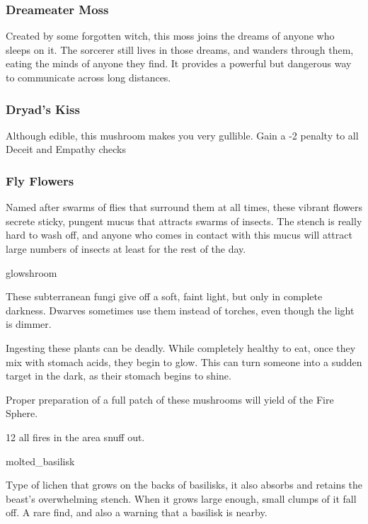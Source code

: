 \begin{multicols}{2}
\subsubsection{Dreameater Moss}
\label{dreameater_moss}
Created by some forgotten witch, this moss joins the dreams of anyone who sleeps on it.
The sorcerer still lives in those dreams, and wanders through them, eating the minds of anyone they find.
It provides a powerful but dangerous way to communicate across long distances.

\subsubsection{Dryad's Kiss}
\label{dryads_kiss}

Although edible, this mushroom makes you very gullible.
Gain a -2 penalty to all Deceit and Empathy checks

\subsubsection{Fly Flowers}
\label{fly_flowers}

Named after swarms of flies that surround them at all times, these vibrant flowers secrete sticky, pungent mucus that attracts swarms of insects.
The stench is really hard to wash off, and anyone who comes in contact with this mucus will attract large numbers of insects at least for the rest of the day.

%
  {glowshroom}%
  {
   These subterranean fungi give off a soft, faint light, but only in complete darkness.
   Dwarves sometimes use them instead of torches, even though the light is dimmer.

   Ingesting these plants can be deadly.
   While completely healthy to eat, once they mix with stomach acids, they begin to glow.
   This can turn someone into a sudden target in the dark, as their stomach begins to shine.

   Proper preparation of a full patch of these mushrooms will yield  of the Fire Sphere.
    }
  {}%
  {12}%
  {all fires in the \gls{area} snuff out.}%

%
  {molted_basilisk}%
  {
  Type of lichen that grows on the backs of basilisks, it also absorbs and retains the beast's overwhelming stench.
  When it grows large enough, small clumps of it fall off.
  A rare find, and also a warning that a basilisk is nearby.

}
\end{multicols}
